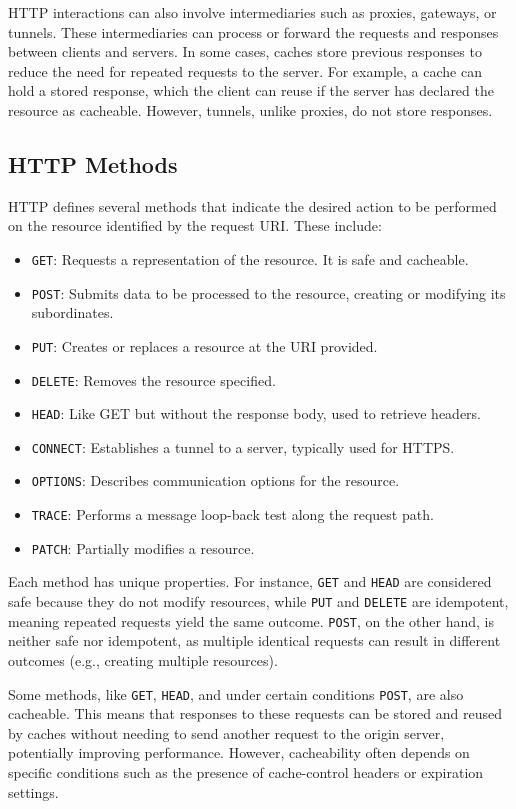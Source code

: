 HTTP interactions can also involve intermediaries such as proxies, gateways, or tunnels. These intermediaries can process or forward the requests and responses between clients and servers. In some cases, caches store previous responses to reduce the need for repeated requests to the server. For example, a cache can hold a stored response, which the client can reuse if the server has declared the resource as cacheable. However, tunnels, unlike proxies, do not store responses.

\subsection*{HTTP Methods}
HTTP defines several methods that indicate the desired action to be performed on the resource identified by the request URI. These include:
\begin{itemize}
    \item \texttt{GET}: Requests a representation of the resource. It is safe and cacheable.
    \item \texttt{POST}: Submits data to be processed to the resource, creating or modifying its subordinates.
    \item \texttt{PUT}: Creates or replaces a resource at the URI provided.
    \item \texttt{DELETE}: Removes the resource specified.
    \item \texttt{HEAD}: Like GET but without the response body, used to retrieve headers.
    \item \texttt{CONNECT}: Establishes a tunnel to a server, typically used for HTTPS.
    \item \texttt{OPTIONS}: Describes communication options for the resource.
    \item \texttt{TRACE}: Performs a message loop-back test along the request path.
    \item \texttt{PATCH}: Partially modifies a resource.
\end{itemize}

Each method has unique properties. For instance, \texttt{GET} and \texttt{HEAD} are considered safe because they do not modify resources, while \texttt{PUT} and \texttt{DELETE} are idempotent, meaning repeated requests yield the same outcome. \texttt{POST}, on the other hand, is neither safe nor idempotent, as multiple identical requests can result in different outcomes (e.g., creating multiple resources).

Some methods, like \texttt{GET}, \texttt{HEAD}, and under certain conditions \texttt{POST}, are also cacheable. This means that responses to these requests can be stored and reused by caches without needing to send another request to the origin server, potentially improving performance. However, cacheability often depends on specific conditions such as the presence of cache-control headers or expiration settings.

